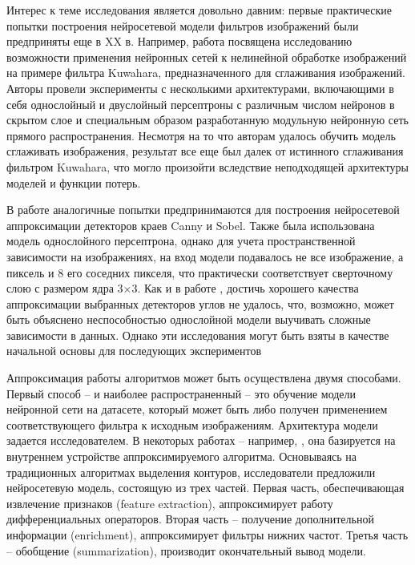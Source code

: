 Интерес к теме исследования является довольно давним: первые практические попытки построения нейросетевой модели фильтров изображений были предприняты еще в XX в. Например, работа \cite{Ridder99Kuwahara} посвящена исследованию возможности применения нейронных сетей к нелинейной обработке изображений на примере фильтра Kuwahara, предназначенного для сглаживания изображений. Авторы провели эксперименты с несколькими архитектурами, включающими в себя однослойный и двуслойный персептроны с различным числом нейронов в скрытом слое и специальным образом разработанную модульную нейронную сеть прямого распространения. Несмотря на то что авторам удалось обучить модель сглаживать изображения, результат все еще был далек от истинного сглаживания фильтром Kuwahara, что могло произойти вследствие неподходящей архитектуры моделей и функции потерь. 

В работе \cite{Fernandez11} аналогичные попытки предпринимаются для построения нейросетевой аппроксимации детекторов краев Canny и Sobel. Также была использована модель однослойного персептрона, однако для учета пространственной зависимости на изображениях, на вход модели подавалось не все изображение, а пиксель и 8 его соседних пикселя, что практически соответствует сверточному слою с размером ядра 3×3. Как и в работе \cite{Ridder99Kuwahara}, достичь хорошего качества аппроксимации выбранных детекторов углов не удалось, что, возможно, может быть объяснено неспособностью однослойной модели выучивать сложные зависимости в данных. Однако эти исследования могут быть взяты в качестве начальной основы для последующих экспериментов

Аппроксимация работы алгоритмов может быть осуществлена двумя способами. Первый способ – и наиболее распространенный – это обучение модели нейронной сети на датасете, который может быть либо получен применением соответствующего фильтра к исходным изображениям. Архитектура модели задается исследователем. В некоторых работах – например, \cite{Wibisono2020TraditionalMI}, она базируется на внутреннем устройстве аппроксимируемого алгоритма. Основываясь на традиционных алгоритмах выделения контуров, исследователи предложили нейросетевую модель, состоящую из трех частей. Первая часть, обеспечивающая извлечение признаков (feature extraction), аппроксимирует работу дифференциальных операторов. Вторая часть – получение дополнительной информации (enrichment), аппроксимирует фильтры нижних частот. Третья часть – обобщение (summarization), производит окончательный вывод модели.

